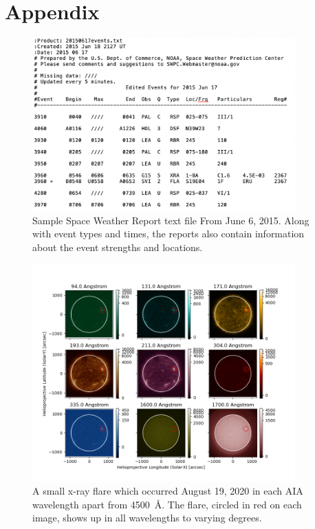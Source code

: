 \documentclass[12pt, letterpaper]{article}
\begin{document}


\pagebreak
\section*{Appendix}


\begin{figure}[ht]
    \includegraphics[width=0.9\textwidth]{figures/swr_sample.png}
    \centering
    \caption{Sample Space Weather Report text file From June 6, 2015. Along with event types and times, the reports also contain information about the event strengths and locations.}
    \label{swr_sample}
\end{figure}

\begin{figure}[ht]
	\includegraphics[width=0.9\textwidth]{figures/0819_flare_labeled.png}
	\centering
	\caption{A small x-ray flare which occurred August 19, 2020 in each AIA wavelength apart from 4500~\AA{}. The flare, circled in red on each image, shows up in all wavelengths to varying degrees.}
	\label{flare}
\end{figure}
\end{document}
